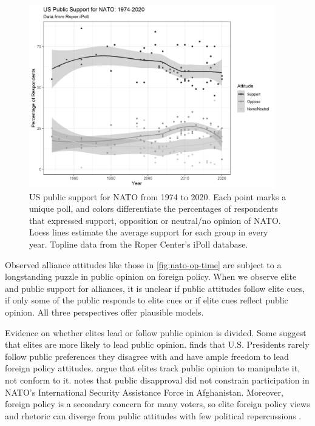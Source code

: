\documentclass[12pt]{article}
\begin{document}
\begin{figure}
	\centering
		\includegraphics[width=0.95\textwidth]{../figures/nato-op-time.png}
	\caption{US public support for NATO from 1974 to 2020. Each point marks a unique poll, and colors differentiate the percentages of respondents that expressed support, opposition or neutral/no opinion of NATO. Loess lines estimate the average support for each group in every year. Topline data from the Roper Center's iPoll database.}
	\label{fig:nato-op-time}
\end{figure}


Observed alliance attitudes like those in \autoref{fig:nato-op-time} are subject to a longstanding puzzle in public opinion on foreign policy.
When we observe elite and public support for alliances, it is unclear if public attitudes follow elite cues, if only some of the public responds to elite cues or if elite cues reflect public opinion. 
All three perspectives offer plausible models. 


Evidence on whether elites lead or follow public opinion is divided.
Some suggest that elites are more likely to lead public opinion. 
\citet{Canes-Wrone2006} finds that U.S. Presidents rarely follow public preferences they disagree with and have ample freedom to lead foreign policy attitudes. 
\citet{JacobsShapiro2000} argue that elites track public opinion to manipulate it, not conform to it. 
\citet{Kreps2010} notes that public disapproval did not constrain participation in NATO's International Security Assistance Force in Afghanistan. 
Moreover, foreign policy is a secondary concern for many voters, so elite foreign policy views and rhetoric can diverge from public attitudes with few political repercussions \citep{BusbyMonten2012}. 
\end{document}
